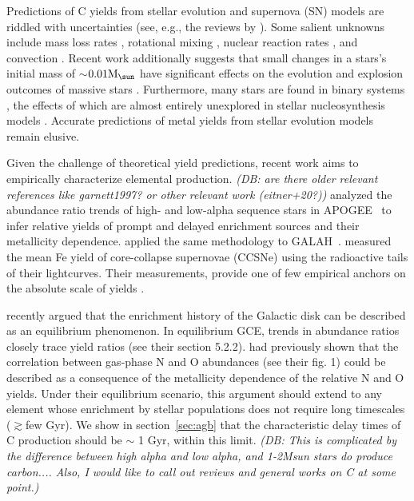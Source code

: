 \documentclass[fleqn,
referee, %
usenatbib]{mnras}
\newcommand{\Mo}{ {\rm M}_{\sun}}
\newcommand{\dbnote}[1]{ {\color{Thistle} \textit{\small (DB: #1)}} }
\begin{document}
Predictions of C yields from stellar evolution and supernova (SN) models are riddled with uncertainties (see, e.g., the reviews by \citealt{romano+10, KL14}).
Some salient unknowns include mass loss rates \citep{sukhbold+16, beasor+2020}, rotational mixing \citep{frischknecht+16, LC18}, nuclear reaction rates \citep{herwig+05, herwig+austin2004}, and convection \citep{chieffi2001, ventura+13}.
Recent work additionally suggests that small changes in a stars's initial mass of 
$\sim$$0.01 \Mo$  have significant effects on the evolution and explosion outcomes of massive stars \citep{bruenn+2023, vartanyan_burrows2023}.
 Furthermore, many stars are found in binary systems \citep{sana+12}, the effects of which are almost entirely
unexplored in stellar nucleosynthesis models \citet{farmer+21}.
Accurate predictions of metal yields from stellar evolution models remain elusive.

Given the challenge of theoretical yield predictions, recent work aims to empirically characterize elemental production. \dbnote{are there older relevant references like garnett1997? or other relevant work (eitner+20?)}
\citet{weinberg+19, weinberg+22} analyzed the abundance ratio trends of high- and low-alpha sequence stars in APOGEE~\citep{apogee17} to infer relative yields of prompt and delayed enrichment sources and their metallicity dependence.
\citet{emily+19, emily+22, emily+24} applied the same methodology to GALAH~\citep{DeSilva2015, Martell2017}.
\citet{rodriguez+21, rodriguez+23} measured the mean Fe yield of core-collapse supernovae (CCSNe) using the radioactive tails of their lightcurves.
Their measurements, provide one of few empirical anchors on the absolute scale of yields \citep{david_fe}.


\citet{james+24} recently argued that the enrichment history of the Galactic disk can be described as an equilibrium phenomenon.
In equilibrium GCE, trends in abundance ratios closely trace yield ratios (see their section 5.2.2).
\citet{james+23} had previously shown that the correlation between gas-phase N and O abundances (see their fig. 1) could be described as a consequence of the metallicity dependence of the relative N and O yields.
Under their equilibrium scenario, this argument should extend to any element whose enrichment by stellar populations does not require long timescales ($\gtrsim$few Gyr).
We show in section~\ref{sec:agb} that the characteristic delay times of C production should be $\sim$ 1 Gyr, within this limit. 
\dbnote{This is complicated by the difference between high alpha and low alpha, and 1-2Msun stars do produce carbon.... Also, I would like to call out reviews and general works on C at some point.}
\end{document}

